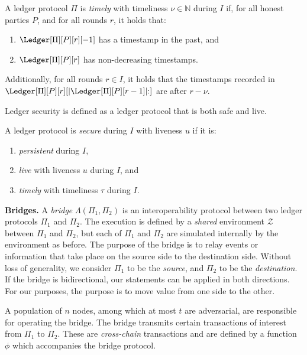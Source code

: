 \begin{definition}[Timeliness]
  A ledger protocol $\Pi$ is \emph{timely} with timeliness $\nu \in \mathbb{N}$ during $I$ if,
  for all honest parties $P$, and for all rounds $r$, it holds that:

  \begin{enumerate}
    \item $\Ledger[\Pi][P][r][-1]$ has a timestamp in the past, and
    \item $\Ledger[\Pi][P][r]$ has non-decreasing timestamps.
  \end{enumerate}

  Additionally, for all rounds $r \in I$, it holds that
  the timestamps recorded in $\Ledger[\Pi][P][r][|\Ledger[\Pi][P][r-1]|{:}]$
  are after $r - \nu$.
\end{definition}

Ledger security is defined as a ledger protocol that is both safe and live.

\begin{definition}[Security]
  A ledger protocol is \emph{secure} during $I$ with liveness $u$ if it is:

  \begin{enumerate}
    \item \emph{persistent} during $I$,
    \item \emph{live} with liveness $u$ during $I$, and
    \item \emph{timely} with timeliness $\tau$ during $I$.
  \end{enumerate}
\end{definition}

\noindent
\textbf{Bridges.}
A \emph{bridge} $\Lambda(\Pi_1, \Pi_2)$ is an interoperability protocol between two ledger protocols
$\Pi_1$ and $\Pi_2$. The execution is defined by a \emph{shared} environment $\mathcal{Z}$ between $\Pi_1$
and $\Pi_2$, but each of $\Pi_1$ and $\Pi_2$ are simulated internally by the environment as before.
The purpose of the bridge is to relay events or information that take place on the source
side to the destination side. Without loss of generality, we consider $\Pi_1$ to be the \emph{source},
and $\Pi_2$ to be the \emph{destination}. If the bridge is bidirectional, our statements can be
applied in both directions. For our purposes, the purpose is to move value from one side to
the other.

A population of $n$ nodes, among which at most $t$ are adversarial, are
responsible for operating the bridge. The bridge transmits certain transactions
of interest from $\Pi_1$ to $\Pi_2$. These are \emph{cross-chain} transactions
and are defined by a function $\phi$ which accompanies the bridge protocol.

